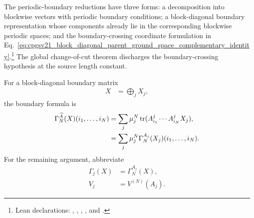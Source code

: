 \documentclass{article}
\begin{document}
The periodic-boundary reductions have three forms: a decomposition into
blockwise vectors with periodic boundary conditions; a block-diagonal boundary
representation whose components already lie in the corresponding blockwise
periodic spaces; and the boundary-crossing coordinate formulation in
Eq.~\ref{eq:cpgsv21_block_diagonal_parent_ground_space_complementary_identity}.\footnote{Lean
declarations:
,
,
,
,
and
.}
The global change-of-cut theorem discharges the boundary-crossing hypothesis at
the source length constant.

For a block-diagonal boundary matrix
\begin{align}
  X
    &=
    \bigoplus_jX_j,
  \label{eq:cpgsv21_block_diagonal_parent_ground_space_block_boundary}
\end{align}
the boundary formula is
\begin{align}
  \Gamma_N^{\widehat A}(X)(i_1,\ldots,i_N)
    &=
    \sum_j\mu_j^N
    \operatorname{tr}(A^j_{i_1}\cdots A^j_{i_N}X_j),
  \label{eq:cpgsv21_block_diagonal_parent_ground_space_weighted_trace_sum}\\
  &=
    \sum_j\mu_j^N
    \Gamma_N^{A_j}(X_j)(i_1,\ldots,i_N).
  \label{eq:cpgsv21_block_diagonal_parent_ground_space_weighted_gamma_sum}
\end{align}
For the remaining argument, abbreviate
\begin{align}
  \Gamma_j(X)
    &=
    \Gamma_N^{A_j}(X),
  \label{eq:cpgsv21_block_diagonal_parent_ground_space_gamma_abbreviation}\\
  V_j
    &=
    V^{(N)}(A_j).
  \label{eq:cpgsv21_block_diagonal_parent_ground_space_vector_abbreviation}
\end{align}
\end{document}
